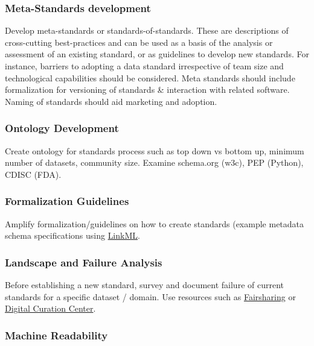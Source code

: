 \documentclass[
  letterpaper,
  DIV=11,
  numbers=noendperiod]{scrartcl}
\begin{document}
\subsubsection{Meta-Standards
development}\label{meta-standards-development}

Develop meta-standards or standards-of-standards. These are descriptions
of cross-cutting best-practices and can be used as a basis of the
analysis or assessment of an existing standard, or as guidelines to
develop new standards. For instance, barriers to adopting a data
standard irrespective of team size and technological capabilities should
be considered. Meta standards should include formalization for
versioning of standards \& interaction with related software. Naming of
standards should aid marketing and adoption.

\subsubsection{Ontology Development}\label{ontology-development}

Create ontology for standards process such as top down vs bottom up,
minimum number of datasets, community size. Examine schema.org (w3c),
PEP (Python), CDISC (FDA).

\subsubsection{Formalization Guidelines}\label{formalization-guidelines}

Amplify formalization/guidelines on how to create standards (example
metadata schema specifications using \href{https://linkml.io}{LinkML}.

\subsubsection{Landscape and Failure
Analysis}\label{landscape-and-failure-analysis}

Before establishing a new standard, survey and document failure of
current standards for a specific dataset / domain. Use resources such as
\href{https://fairsharing.org/}{Fairsharing} or
\href{https://www.dcc.ac.uk/guidance/standards}{Digital Curation
Center}.

\subsubsection{Machine Readability}\label{machine-readability}
\end{document}
